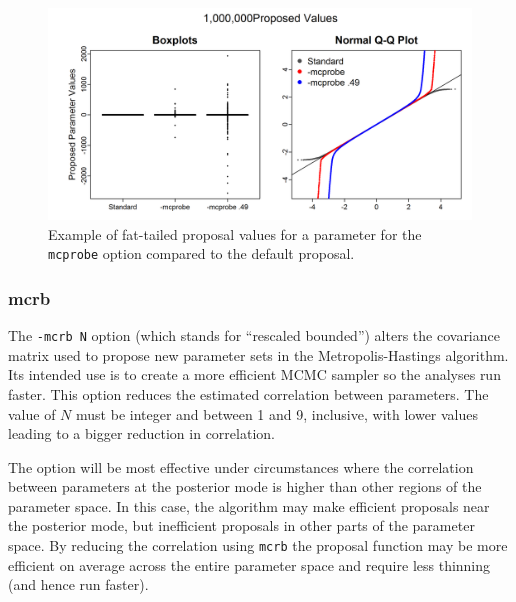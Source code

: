 \documentclass{article}\usepackage[]{graphicx}\usepackage[]{color}
\begin{document}
\begin{figure}[h]
  \centering
  \includegraphics[width=5in]{../plots/mcprobe_example.png}
  \caption{Example of fat-tailed proposal values for a
    parameter for the \texttt{mcprobe} option compared to
    the default proposal.}
  \label{fig:mcprobe_example}
\end{figure}

\subsubsection{mcrb}\label{sec:mcrb}
The \texttt{-mcrb N} option (which stands for ``rescaled
bounded'') alters the covariance matrix used to propose new
parameter sets in the Metropolis-Hastings algorithm. Its
intended use is to create a more efficient MCMC sampler so
the analyses run faster. This option reduces the estimated
correlation between parameters. The value of $N$ must be
integer and between 1 and 9, inclusive, with lower values
leading to a bigger reduction in correlation.

The option will be most effective under circumstances where
the correlation between parameters at the posterior mode is
higher than other regions of the parameter space. In this
case, the algorithm may make efficient proposals near the
posterior mode, but inefficient proposals in other parts of
the parameter space. By reducing the correlation using
\texttt{mcrb} the proposal function may be more efficient on
average across the entire parameter space and require less
thinning (and hence run faster).
\end{document}
